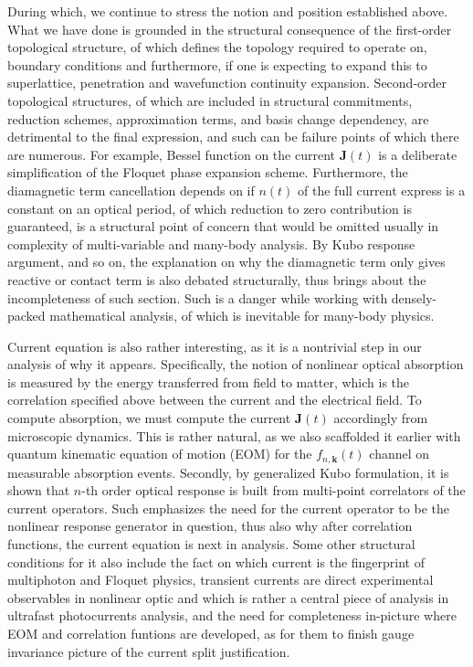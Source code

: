 \documentclass[%
 reprint,
 amsmath,amssymb,
 aps,
]{revtex4-2}
\begin{document}
During which, we continue to stress the notion and position established above. What we have done is grounded in the structural consequence of the first-order topological structure, of which defines the topology required to operate on, boundary conditions and furthermore, if one is expecting to expand this to superlattice, penetration and wavefunction continuity expansion. Second-order topological structures, of which are included in structural commitments, reduction schemes, approximation terms, and basis change dependency, are detrimental to the final expression, and such can be failure points of which there are numerous. For example, Bessel function on the current $\mathbf{J}(t)$ is a deliberate simplification of the Floquet phase expansion scheme. Furthermore, the diamagnetic term cancellation depends on if $n(t)$ of the full current express is a constant on an optical period, of which reduction to zero contribution is guaranteed, is a structural point of concern that would be omitted usually in complexity of multi-variable and many-body analysis. By Kubo response argument, and so on, the explanation on why the diamagnetic term only gives reactive or contact term is also debated structurally, thus brings about the incompleteness of such section. Such is a danger while working with densely-packed mathematical analysis, of which is inevitable for many-body physics. 

Current equation is also rather interesting, as it is a nontrivial step in our analysis of why it appears. Specifically, the notion of nonlinear optical absorption is measured by the energy transferred from field to matter, which is the correlation specified above between the current and the electrical field. To compute absorption, we must compute the current $\mathbf{J}(t)$ accordingly from microscopic dynamics. This is rather natural, as we also scaffolded it earlier with quantum kinematic equation of motion (EOM) for the $f_{n,\mathbf{k}}(t)$ channel on measurable absorption events. Secondly, by generalized Kubo formulation, it is shown that $n$-th order optical response is built from multi-point correlators of the current operators. Such emphasizes the need for the current operator to be the nonlinear response generator in question, thus also why after correlation functions, the current equation is next in analysis. Some other structural conditions for it also include the fact on which current is the fingerprint of multiphoton and Floquet physics, transient currents are direct experimental observables in nonlinear optic and which is rather a central piece of analysis in ultrafast photocurrents analysis, and the need for completeness in-picture where EOM and correlation funtions are developed, as for them to finish gauge invariance picture of the current split justification. 
\end{document}
